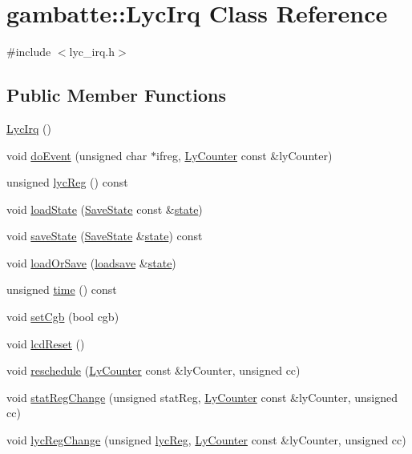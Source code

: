 \hypertarget{classgambatte_1_1LycIrq}{}\section{gambatte\+:\+:Lyc\+Irq Class Reference}
\label{classgambatte_1_1LycIrq}


{\ttfamily \#include $<$lyc\+\_\+irq.\+h$>$}

\subsection*{Public Member Functions}
\begin{DoxyCompactItemize}
\item 
\hyperlink{classgambatte_1_1LycIrq_aad94ac6413d3f849b688636273420fff}{Lyc\+Irq} ()
\item 
void \hyperlink{classgambatte_1_1LycIrq_aa89cc468ccee7c8c9012f7ec31b2b900}{do\+Event} (unsigned char $\ast$ifreg, \hyperlink{classgambatte_1_1LyCounter}{Ly\+Counter} const \&ly\+Counter)
\item 
unsigned \hyperlink{classgambatte_1_1LycIrq_aa0c87be5b827d0a1bf9ed54e5e8e0786}{lyc\+Reg} () const
\item 
void \hyperlink{classgambatte_1_1LycIrq_a3dbcaa80af33a03f83be90bfb8d9c63d}{load\+State} (\hyperlink{structgambatte_1_1SaveState}{Save\+State} const \&\hyperlink{ppu_8cpp_a2f2eca6997ee7baf8901725ae074d45b}{state})
\item 
void \hyperlink{classgambatte_1_1LycIrq_ad0e92af711e022f3d04f26849ca5210b}{save\+State} (\hyperlink{structgambatte_1_1SaveState}{Save\+State} \&\hyperlink{ppu_8cpp_a2f2eca6997ee7baf8901725ae074d45b}{state}) const
\item 
void \hyperlink{classgambatte_1_1LycIrq_add90bd20cfb838f5fa3ad17bb11af885}{load\+Or\+Save} (\hyperlink{classgambatte_1_1loadsave}{loadsave} \&\hyperlink{ppu_8cpp_a2f2eca6997ee7baf8901725ae074d45b}{state})
\item 
unsigned \hyperlink{classgambatte_1_1LycIrq_a14583cea042d0c5e4533a53553a1a5a4}{time} () const
\item 
void \hyperlink{classgambatte_1_1LycIrq_a791ca3897dd6ca732133dd355c6b6320}{set\+Cgb} (bool cgb)
\item 
void \hyperlink{classgambatte_1_1LycIrq_a321338c36a2b5f6b2a24092134cc7b86}{lcd\+Reset} ()
\item 
void \hyperlink{classgambatte_1_1LycIrq_ab692c00c8c9083c651302b3a78146530}{reschedule} (\hyperlink{classgambatte_1_1LyCounter}{Ly\+Counter} const \&ly\+Counter, unsigned cc)
\item 
void \hyperlink{classgambatte_1_1LycIrq_a13ff1c934bb2c3ecf96777837648913e}{stat\+Reg\+Change} (unsigned stat\+Reg, \hyperlink{classgambatte_1_1LyCounter}{Ly\+Counter} const \&ly\+Counter, unsigned cc)
\item 
void \hyperlink{classgambatte_1_1LycIrq_a5c8dd6fee0a1ce846964d06a08a06dec}{lyc\+Reg\+Change} (unsigned \hyperlink{classgambatte_1_1LycIrq_aa0c87be5b827d0a1bf9ed54e5e8e0786}{lyc\+Reg}, \hyperlink{classgambatte_1_1LyCounter}{Ly\+Counter} const \&ly\+Counter, unsigned cc)
\end{DoxyCompactItemize}
